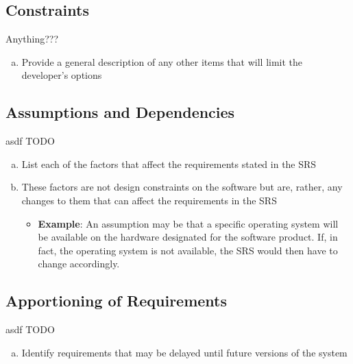 \documentclass[]{article}
\begin{document}
\subsection{Constraints}%
\label{sub:constraints}
Anything???


\color{red}
\begin{enumerate}[a)]
	\item Provide a general description of any other items that will limit the developer's options
\end{enumerate}
\color{black}

\subsection{Assumptions and Dependencies}%
\label{sub:assumptions_and_dependencies}
asdf TODO


\color{red}
\begin{enumerate}[a)]
    \item List each of the factors that affect the requirements stated in the SRS
    \item These factors are not design constraints on the software but are, rather, any changes to
    them that can affect the requirements in the SRS
	\begin{itemize}
        \item \textbf{Example}: An assumption may be that a specific operating system will be
        available on the hardware designated for the software product. If, in fact, the operating
        system is not available, the SRS would then have to change accordingly.
	\end{itemize}
\end{enumerate}
\color{black}

\subsection{Apportioning of Requirements}%
\label{sub:apportioning_of_requirements}
asdf TODO


\color{red}
\begin{enumerate}[a)]
	\item Identify requirements that may be delayed until future versions of the system
\end{enumerate}
\color{black}

\end{document}
